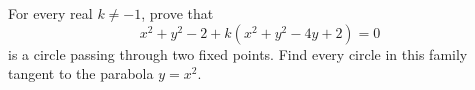 For every real $k\ne-1$, prove that
\[
x^2+y^2-2+k(x^2+y^2-4y+2)=0
\]
is a circle passing through two fixed points. Find every circle in this family tangent to the parabola $y=x^2$.
